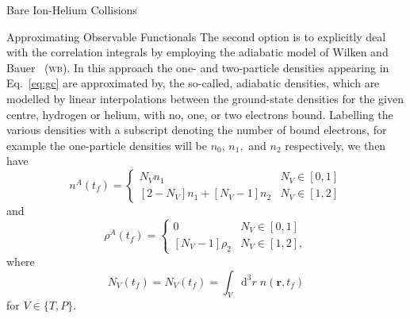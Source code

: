 \documentclass[letterpaper, 11 pt]{report}
\begin{document}
\begin{chapter}{Bare Ion-Helium Collisions \label{chap:p-he2p-he}}
\begin{section}{Approximating Observable Functionals \label{sec:phe2p-obs}}
      The second option is to explicitly deal with the correlation integrals by employing the adiabatic
      model of Wilken and Bauer~\cite{wb} (\textsc{wb}). In this approach the one- and two-particle
      densities appearing in Eq.~\eqref{eq:gc} are approximated by, the so-called, adiabatic densities,
      which are modelled by linear interpolations between the ground-state densities for the given
      centre, hydrogen or helium, with no, one, or two electrons bound. Labelling the various densities
      with a subscript denoting the number of bound electrons, for example the one-particle densities
      will be $n_0$, $ n_1,$ and $n_2$ respectively, we then have
      \begin{equation} \label{eq:n1a}
         n^{A} (t_f) = \begin{cases}
         N_V n_1 & N_V \in [0,1] \\
         \left[ 2-N_V \right] n_1 + \left[ N_V-1 \right] n_2 & N_V \in [1,2]
         \end{cases}
      \end{equation}
      and
      \begin{equation} \label{eq:p2a}
         \rho^{A} (t_f) =
         \begin{cases}
            0 & N_V \in [0,1] \\
            \left[ N_V-1 \right] \rho_2 & N_V \in [1,2],
         \end{cases}
      \end{equation}
      where
      \begin{equation} \label{eq:Nv}
         N_V(t_f) = N_V(t_f) = \int_V \mathrm{d}^3 r \; n(\mathbf{r},t_f)
      \end{equation}
      for $V \in \{T,P\}$.


\end{section}
\end{chapter}
\end{document}
